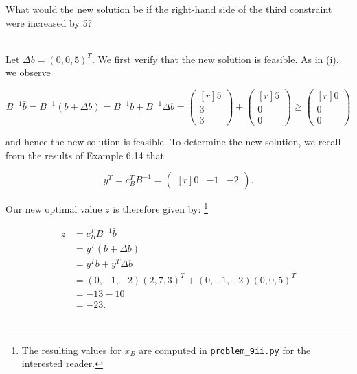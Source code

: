What would the new solution be if the right-hand side of the third constraint were increased by 5?

\begin{solution}
  \ \\
  Let $\Delta b = (0, 0, 5)^T$. We first verify that the new solution is feasible. As in (i), we observe

  $$
  B^{-1}\bar{b} = B^{-1} \left( b + \Delta b \right) = B^{-1}b + B^{-1}\Delta b = \begin{pmatrix*}[r]
    5 \\
    3 \\
    3 
  \end{pmatrix*} + \begin{pmatrix*}[r]
    5 \\
    0 \\
    0
  \end{pmatrix*} \ge \begin{pmatrix*}[r]
    0 \\
    0 \\
    0
  \end{pmatrix*}
  $$

  and hence the new solution is feasible. To determine the new solution, we recall from the results of Example 6.14 that

  $$
  y^T = c_B^T B^{-1} = \begin{pmatrix*}[r]
    0 & -1 & -2
  \end{pmatrix*}.
  $$

  Our new optimal value $\bar{z}$ is therefore given by: \footnote{
    The resulting values for $x_B$ are computed in \texttt{problem\_9ii.py} for the interested reader.
  }
  
  \begin{align*}
    \bar{z} &= c_B^T B^{-1} \bar{b} \\
            &= y^T \left(b + \Delta b \right) \\
            &= y^T b + y^T \Delta b \\
            &= (0, -1, -2)(2, 7,  3)^T + (0, -1, -2)(0, 0, 5)^T \\
            &= -13 - 10 \\
            &= -23.
  \end{align*}
  \ \\
\end{solution}
